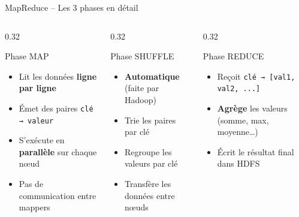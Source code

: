 \documentclass[aspectratio=169, 11pt]{beamer}
\begin{document}
\begin{frame}{MapReduce -- Les 3 phases en détail}
  \begin{columns}[T]
    \begin{column}{0.32\textwidth}
      \begin{block}{ Phase MAP}
        \begin{itemize}
          \item Lit les données \textbf{ligne par ligne}
          \item Émet des paires \texttt{clé → valeur}
          \item S'exécute en \textbf{parallèle} sur chaque nœud
          \item Pas de communication entre mappers
        \end{itemize}
      \end{block}
    \end{column}
    \begin{column}{0.32\textwidth}
      \begin{block}{ Phase SHUFFLE}
        \begin{itemize}
          \item \textbf{Automatique} (faite par Hadoop)
          \item Trie les paires par clé
          \item Regroupe les valeurs par clé
          \item Transfère les données entre nœuds
        \end{itemize}
      \end{block}
    \end{column}
    \begin{column}{0.32\textwidth}
      \begin{block}{ Phase REDUCE}
        \begin{itemize}
          \item Reçoit \texttt{clé → [val1, val2, ...]}
          \item \textbf{Agrège} les valeurs (somme, max, moyenne\ldots)
          \item Écrit le résultat final dans HDFS
        \end{itemize}
      \end{block}
    \end{column}
  \end{columns}
\end{frame}

\end{document}
